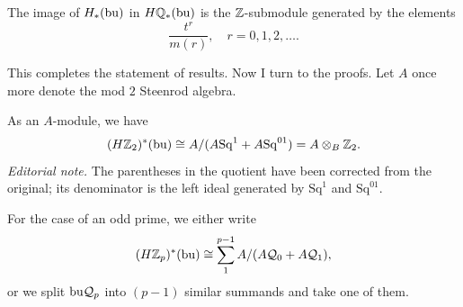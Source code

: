 \documentclass[../main]{subfiles}
\begin{document}
\begin{proposition} \label{prop:p3ch16.5} The image of $H_{\ast}(\mathrm{bu})$ in $H\mathbb{Q}_{\ast}(\mathrm{bu})$ is the $\mathbb{Z}$-submodule generated by the elements \[
    \frac{t^{r}}{m(r)}, \quad r=0, 1, 2, \dots .
\]

\end{proposition}
   This completes the statement of results. Now I turn to the proofs.
Let $A$ once more denote the mod $2$ Steenrod algebra. 
\begin{proposition} \label{prop:p3ch16.6}
    As an $A$-module, we have \[
        (H\mathbb{Z}_2)^\ast(\mathrm{bu})\cong A/(A\mathrm{Sq}^1+A\mathrm{Sq}^{01})=A\otimes_B\mathbb{Z}_2.
    \]
\noindent\textit{Editorial note.} The parentheses in the quotient have been corrected from the original; its denominator is the left ideal generated by $\mathrm{Sq}^1$ and $\mathrm{Sq}^{01}$.
\end{proposition}
For the case of an odd prime, we either write \[
    (H\mathbb{Z}_{p})^{\ast}(\mathrm{bu}) \cong \sum_{1}^{p-1} A/(A\mathcal{Q}_{0}+A\mathcal{Q}_{1}), 
\]
    or we split $\mathrm{bu} \mathcal{Q}_{p}$ into $(p-1)$ similar summands and take one of them. 
    
\end{document}
